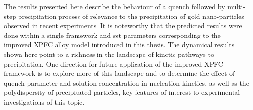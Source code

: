 \documentclass[showkeys, prb, reprint]{revtex4-1}
\begin{document}
The results presented here describe the behaviour of a quench followed by
multi-step precipitation process of relevance to the precipitation of gold
nano-particles observed in recent experiments. It is noteworthy that the
predicted results were done within a single framework and set parameters
corresponding to the improved XPFC alloy model introduced in this thesis. The
dynamical results shown here point to a richness in the landscape of kinetic
pathways to precipitation. One direction for future application of the improved
XPFC framework is to explore more of this landscape and to determine the effect
of quench parameter and solution concentration in nucleation kinetics, as well
as the polydispersity of precipitated particles, key features of interest to
experimental investigations of this topic.


\end{document}
